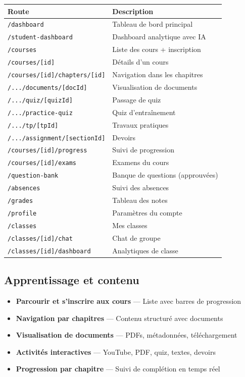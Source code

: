 \documentclass[12pt,a4paper]{article}
\begin{document}
\begin{longtable}{@{}p{7cm}p{7.5cm}@{}}
\toprule
\textbf{Route} & \textbf{Description} \\
\midrule
\endhead
\texttt{/dashboard} & Tableau de bord principal \\
\texttt{/student-dashboard} & Dashboard analytique avec IA \\
\texttt{/courses} & Liste des cours + inscription \\
\texttt{/courses/[id]} & Détails d'un cours \\
\texttt{/courses/[id]/chapters/[id]} & Navigation dans les chapitres \\
\texttt{/.../documents/[docId]} & Visualisation de documents \\
\texttt{/.../quiz/[quizId]} & Passage de quiz \\
\texttt{/.../practice-quiz} & Quiz d'entraînement \\
\texttt{/.../tp/[tpId]} & Travaux pratiques \\
\texttt{/.../assignment/[sectionId]} & Devoirs \\
\texttt{/courses/[id]/progress} & Suivi de progression \\
\texttt{/courses/[id]/exams} & Examens du cours \\
\texttt{/question-bank} & Banque de questions (approuvées) \\
\texttt{/absences} & Suivi des absences \\
\texttt{/grades} & Tableau des notes \\
\texttt{/profile} & Paramètres du compte \\
\texttt{/classes} & Mes classes \\
\texttt{/classes/[id]/chat} & Chat de groupe \\
\texttt{/classes/[id]/dashboard} & Analytiques de classe \\
\bottomrule
\end{longtable}

\subsection{Apprentissage et contenu}

\begin{itemize}
    \item \textbf{Parcourir et s'inscrire aux cours} --- Liste avec barres de progression
    \item \textbf{Navigation par chapitres} --- Contenu structuré avec documents
    \item \textbf{Visualisation de documents} --- PDFs, métadonnées, téléchargement
    \item \textbf{Activités interactives} --- YouTube, PDF, quiz, textes, devoirs
    \item \textbf{Progression par chapitre} --- Suivi de complétion en temps réel
\end{itemize}
\end{document}
